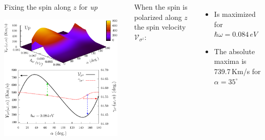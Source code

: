 \documentclass{beamer}
\begin{document}
\begin{frame}

\begin{columns}


\begin{center}

Fixing the spin along $z$ for \emph{up}

\vspace{2mm}

\includegraphics[width=0.95\textwidth]{figs/fig4.pdf}

\end{center}  



{ When the spin is polarized along $z$ the spin velocity
$\mathcal{V}_{\sigma^{z}}$:}


\vspace{-2mm}

{\small

\begin{itemize}

\item 
Is maximized for $\hbar \omega = 0.084\,eV$

\vspace{-1mm}
\item 
The absolute maxima is 739.7\,Km/s for $\alpha = 35^{\circ}$


\end{itemize}}
\end{columns}
\end{frame}
\end{document}
